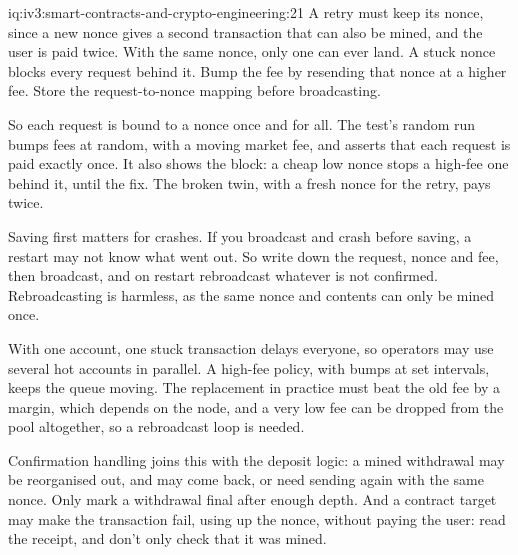 \begin{solution}{iq:iv3:smart-contracts-and-crypto-engineering:21}
A retry must keep its nonce, since a new nonce gives a second transaction that can also be mined, and the user is paid twice. With the same nonce, only one can ever land. A stuck nonce blocks every request behind it. Bump the fee by resending that nonce at a higher fee. Store the request-to-nonce mapping before broadcasting.
\label{lst:iv3:cr:withdraw}

So each request is bound to a nonce once and for all. The test's random run bumps fees at random, with a moving market fee, and asserts that each request is paid exactly once. It also shows the block: a cheap low nonce stops a high-fee one behind it, until the fix. The broken twin, with a fresh nonce for the retry, pays twice.

Saving first matters for crashes. If you broadcast and crash before saving, a restart may not know what went out. So write down the request, nonce and fee, then broadcast, and on restart rebroadcast whatever is not confirmed. Rebroadcasting is harmless, as the same nonce and contents can only be mined once.

With one account, one stuck transaction delays everyone, so operators may use several hot accounts in parallel. A high-fee policy, with bumps at set intervals, keeps the queue moving. The replacement in practice must beat the old fee by a margin, which depends on the node, and a very low fee can be dropped from the pool altogether, so a rebroadcast loop is needed.

Confirmation handling joins this with the deposit logic: a mined withdrawal may be reorganised out, and may come back, or need sending again with the same nonce. Only mark a withdrawal final after enough depth. And a contract target may make the transaction fail, using up the nonce, without paying the user: read the receipt, and don't only check that it was mined.

\end{solution}

